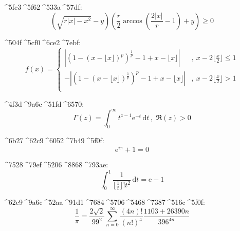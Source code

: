 \documentclass{article}
\begin{document}
\vspace{1cm}

^^^^5fc3^^^^5f62^^^^533a^^^^57df: 
\[
\left( \sqrt{r\left| x \right|-x^2}-y \right) \left( \frac{r}{2}\arccos \left( \frac{2\left| x \right|}{r}-1 \right) +y \right) \geqslant 0
\]

\vspace{1cm}

^^^^504f^^^^5cf0^^^^6ce2^^^^7ebf: 
\[
f\left( x \right)=\left\{ 
\begin{array}{ll}
\left| \left( 1-\left( x-\lfloor x \rfloor \right) ^p \right) ^{\frac{1}{p}}-1+x-\lfloor x \rfloor \right| & ,\ x-2\lfloor \frac{x}{2} \rfloor \leqslant 1\\[6pt]
-\left| \left( 1-\left( x-\lfloor x \rfloor \right) ^{\frac{1}{p}} \right) ^p-1+x-\lfloor x \rfloor \right| & ,\ x-2\lfloor \frac{x}{2} \rfloor >1\\
\end{array} 
\right. 
\]

\vspace{1cm}

^^^^4f3d^^^^9a6c^^^^51fd^^^^6570: 
\[
\Gamma \left( z \right) =\int_0^{\infty}{t^{z-1}\mathrm{e}^{-t}\,\mathrm{d}t}\,,\,\, \Re \left( z \right) >0
\]

\vspace{1cm}

^^^^6b27^^^^62c9^^^^6052^^^^7b49^^^^5f0f: 
\[
\mathrm{e}^{i\pi}+1=0
\]

\vspace{1cm}

^^^^7528^^^^79ef^^^^5206^^^^8868^^^^793ae: 
\[
\int_0^1{\frac{1}{\lfloor \frac{1}{t} \rfloor !t^2}\,\mathrm{d}t}=\mathrm{e}-1
\]

\vspace{1cm}

^^^^62c9^^^^9a6c^^^^52aa^^^^91d1^^^^7684^^^^5706^^^^5468^^^^7387^^^^516c^^^^5f0f: 
\[
\frac{1}{\pi}=\frac{2\sqrt{2}}{99^2}\sum_{n=0}^{\infty}{\frac{\left( 4n \right) !}{\left( n! \right) ^4}\frac{1103+26390n}{396^{4n}}}
\]
\end{document}
